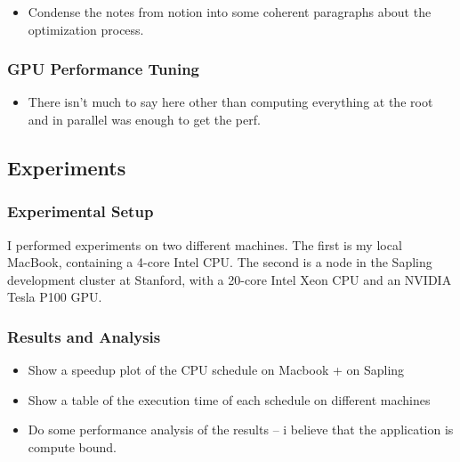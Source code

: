 \documentclass{article}
\begin{document}
\begin{itemize}
    \item Condense the notes from notion into some coherent paragraphs about the optimization process.
\end{itemize}

\subsubsection{GPU Performance Tuning}

\begin{itemize}
    \item There isn't much to say here other than computing everything at the root and in parallel was enough to get the perf.
\end{itemize}

\subsection{Experiments}

\subsubsection{Experimental Setup}

I performed experiments on two different machines. The first is my local MacBook, containing a 4-core Intel CPU. 
%
The second is a node in the Sapling development cluster at Stanford, with a 20-core Intel Xeon CPU and an NVIDIA Tesla P100 GPU.

\subsubsection{Results and Analysis}

\begin{itemize}
    \item Show a speedup plot of the CPU schedule on Macbook + on Sapling
    \item Show a table of the execution time of each schedule on different machines
    \item Do some performance analysis of the results -- i believe that the application is compute bound.
\end{itemize}


\end{document}
